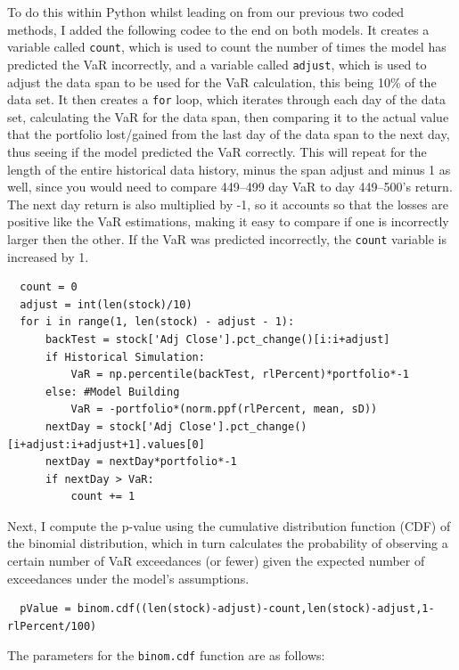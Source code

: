 \documentclass{article}
\begin{document}
To do this within Python whilst leading on from our previous two coded methods, I added the following codee to the end on both models. It creates a variable called \texttt{count}, which is used to count the number of times the model has predicted the VaR incorrectly, and a variable called \texttt{adjust}, which is used to adjust the data span to be used for the VaR calculation, this being 10\% of the data set. It then creates a \texttt{for} loop, which iterates through each day of the data set, calculating the VaR for the data span, then comparing it to the actual value that the portfolio lost/gained from the last day of the data span to the next day, thus seeing if the model predicted the VaR correctly. This will repeat for the length of the entire historical data history, minus the span adjust and minus 1 as well, since you would need to compare 449--499 day VaR to day 449--500's return. The next day return is also multiplied by -1, so it accounts so that the losses are positive like the VaR estimations, making it easy to compare if one is incorrectly larger then the other. If the VaR was predicted incorrectly, the \texttt{count} variable is increased by 1.\\\vspace{0.3cm}

\begin{verbatim}
  count = 0
  adjust = int(len(stock)/10)
  for i in range(1, len(stock) - adjust - 1):
      backTest = stock['Adj Close'].pct_change()[i:i+adjust]
      if Historical Simulation:
          VaR = np.percentile(backTest, rlPercent)*portfolio*-1
      else: #Model Building
          VaR = -portfolio*(norm.ppf(rlPercent, mean, sD))
      nextDay = stock['Adj Close'].pct_change()[i+adjust:i+adjust+1].values[0]
      nextDay = nextDay*portfolio*-1
      if nextDay > VaR:
          count += 1
\end{verbatim}

 Next, I compute the p-value using the cumulative distribution function (CDF) of the binomial distribution, which in turn calculates the probability of observing a certain number of VaR exceedances (or fewer) given the expected number of exceedances under the model's assumptions.\vspace{0.3cm}
 
 \begin{verbatim}
  pValue = binom.cdf((len(stock)-adjust)-count,len(stock)-adjust,1-rlPercent/100)
  \end{verbatim}

 The parameters for the \texttt{binom.cdf} function are as follows:
\end{document}
